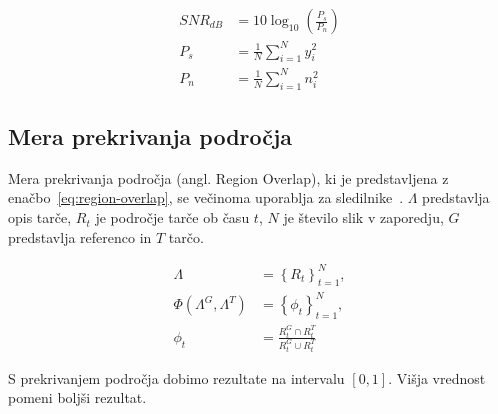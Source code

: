 \begin{subequations}
\begin{align}
SNR_{dB} &= 10 \log_{10}\left(\frac{P_s}{P_n}\right) \\
P_s &= \frac{1}{N} \sum_{i=1}^{N} y_i^2 \\
P_n &= \frac{1}{N} \sum_{i=1}^{N} n_i^2
\end{align}
\label{eq:snr}
\end{subequations}



\subsection{Mera prekrivanja področja}
Mera prekrivanja področja (angl. Region Overlap), ki je predstavljena z enačbo~\ref{eq:region-overlap}, se večinoma uporablja za sledilnike~\cite{vcehovin2016visual}. $\Lambda$ predstavlja opis tarče, $R_t$ je področje tarče ob času $t$, $N$ je število slik v zaporedju, $G$ predstavlja referenco in $T$ tarčo.

\begin{subequations}
\begin{align}
	\Lambda &= \left\{R_t\right\}^N_{t=1}, \nonumber \\
	\Phi(\Lambda^G, \Lambda^T) &= \left\{\phi_t\right\}^N_{t=1}, \nonumber \\
    \phi_t &= \frac{R_t^G \cap R_t^T }{R_t^G \cup R_t^T} 
\end{align}
\label{eq:region-overlap}
\end{subequations}


S prekrivanjem področja dobimo rezultate na intervalu $\left[0,1\right]$. Višja vrednost pomeni boljši rezultat.



